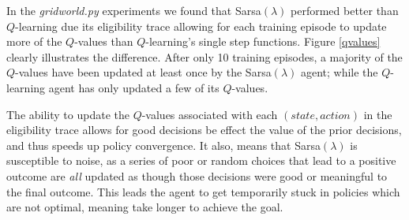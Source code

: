 \documentclass[10pt,conference]{IEEEtran}
\begin{document}
	In the \textit{gridworld.py} experiments we found that Sarsa\((\lambda)\) 
	performed better than \(Q\)-learning due its eligibility trace allowing for
	each training episode to update more of the \(Q\)-values than \(Q\)-learning's
	single step functions.  Figure \ref{qvalues} clearly illustrates the difference. 
	After only 10 training episodes, a majority of the \(Q\)-values have been
	updated at least once by the Sarsa\((\lambda)\) agent; while the \(Q\)-learning
	agent has only updated a few of its \(Q\)-values.

	The ability to update the \(Q\)-values associated with each \((state,action)\) 
	in the eligibility trace allows for good decisions be effect the value of the 
	prior decisions, and thus speeds up policy convergence.  It also, means that
	Sarsa\((\lambda)\) is susceptible to noise, as a series of poor or random choices 
	that lead to a positive outcome are \textit{all} updated as though those 
	decisions were good or meaningful to the final outcome.  This leads the agent
	to get temporarily stuck in policies which are not optimal, meaning take longer
	to achieve the goal.
\end{document}

